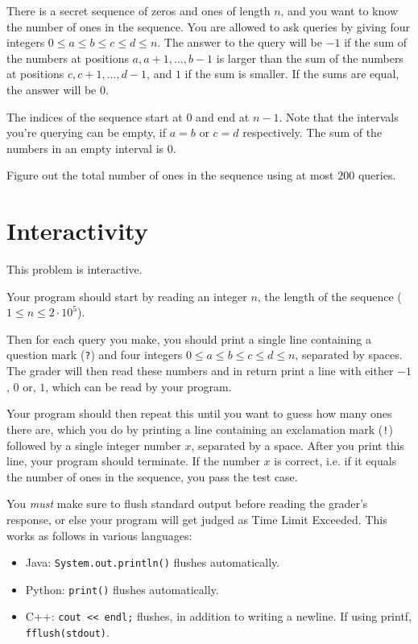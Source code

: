 There is a secret sequence of zeros and ones of length $n$, and you want to know the number of ones in the sequence.
You are allowed to ask queries by giving four integers $0 \leq a \leq b \leq c \leq d \leq n$.
The answer to the query will be $-1$ if the sum of the numbers at positions $a, a+1, ..., b-1$ is larger than the
sum of the numbers at positions $c, c+1, ..., d-1$, and $1$ if the sum is smaller.
If the sums are equal, the answer will be $0$.

The indices of the sequence start at $0$ and end at $n-1$.
Note that the intervals you're querying can be empty, if $a = b$ or $c = d$ respectively.
The sum of the numbers in an empty interval is $0$.

Figure out the total number of ones in the sequence using at most $200$ queries.

\section*{Interactivity}
This problem is interactive.

Your program should start by reading an integer $n$, the length of the sequence ($1 \le n \le 2 \cdot 10^5$).

Then for each query you make, you should print a single line containing a question mark (\texttt{?}) and
four integers $0 \leq a \leq b \leq c \leq d \leq n$, separated by spaces.
The grader will then read these numbers and in return print a line with either $-1$, $0$ or, $1$, which can be read by your program.

Your program should then repeat this until you want to guess how many ones there are,
which you do by printing a line containing an exclamation mark (\texttt{!}) followed by a single integer number $x$, separated by a space.
After you print this line, your program should terminate.
If the number $x$ is correct, i.e. if it equals the number of ones in the sequence, you pass the test case.

You \emph{must} make sure to flush standard output before reading the grader's response, or else your program
will get judged as Time Limit Exceeded. This works as follows in various languages:
\begin{itemize}
  \item Java: \texttt{System.out.println()} flushes automatically.
  \item Python: \texttt{print()} flushes automatically.
  \item C++: \texttt{cout <{}< endl;} flushes, in addition to writing a newline. If using printf, \texttt{fflush(stdout)}.
\end{itemize}

